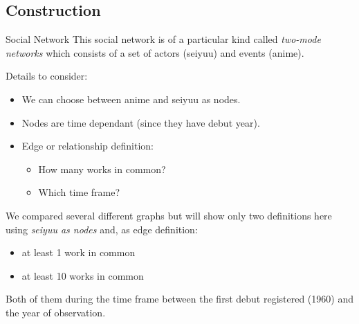 \subsection{Construction}
\begin{frame}{Social Network}
This social network is of a particular kind called \emph{two-mode networks} which consists of a set of actors (seiyuu) and events (anime).
\vspace{15pt}

Details to consider:
\begin{itemize}
\item We can choose between anime and seiyuu as nodes.
\item Nodes are time dependant (since they have debut year).
\item Edge or relationship definition:
	\begin{itemize}
	\item How many works in common?
	\item Which time frame?
	\end{itemize}
\end{itemize}
\vspace{15pt}
\end{frame}

\begin{frame}
We compared several different graphs but will show only two definitions here using \emph{seiyuu as nodes} and, as edge definition:
\begin{itemize}
\item at least 1 work in common
\item at least 10 works in common
\end{itemize}
Both of them during the time frame between the first debut registered (1960) and the year of observation.
\end{frame}

